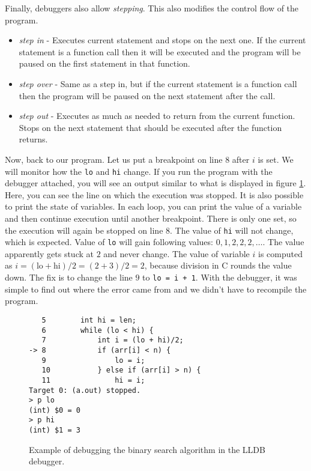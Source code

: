 Finally, debuggers also allow \textit{stepping}. This also modifies the control
flow of the program.
\begin{itemize}
    \item \textit{step in} - Executes current statement and stops on the next
        one. If the current statement is a function call then it will be
        executed and the program will be paused on the first statement in that
        function.
    \item \textit{step over} - Same as a step in, but if the current statement
        is a function call then the program will be paused on the next
        statement after the call.
    \item \textit{step out} -  Executes as much as needed to return from the
        current function. Stops on the next statement that should be executed
        after the function returns.
\end{itemize}

Now, back to our program. Let us put a breakpoint on line $8$ after $i$ is set.
We will monitor how the \texttt{lo} and \texttt{hi} change. If you run the
program with the debugger attached, you will see an output similar to what is
displayed in figure \ref{fig:lldb-debug1}. Here, you can see the line on which
the execution was stopped. It is also possible to print the state of variables.
In each loop, you can print the value of a variable and then continue execution
until another breakpoint. There is only one set, so the execution will again be
stopped on line $8$. The value of \texttt{hi} will not change, which is
expected. Value of \texttt{lo} will gain following values: $0, 1, 2, 2, 2,
\dots$. The value apparently gets stuck at $2$ and never change. The value of
variable $i$ is computed as $i = (\text{lo} + \text{hi})/2 = (2 + 3)/2 = 2$,
because division in C rounds the value down. The fix is to change the line $9$
to \texttt{lo = i + 1}. With the debugger, it was simple to find out where the
error came from and we didn't have to recompile the program.

\begin{figure}
\begin{verbatim}
   5   	    int hi = len;
   6   	    while (lo < hi) {
   7   	        int i = (lo + hi)/2;
-> 8   	        if (arr[i] < n) {
   9   	            lo = i;
   10  	        } else if (arr[i] > n) {
   11  	            hi = i;
Target 0: (a.out) stopped.
> p lo
(int) $0 = 0
> p hi
(int) $1 = 3
\end{verbatim}
    \caption{Example of debugging the binary search algorithm in the
    LLDB~\cite{lldb} debugger.}
    \label{fig:lldb-debug1}
\end{figure}

